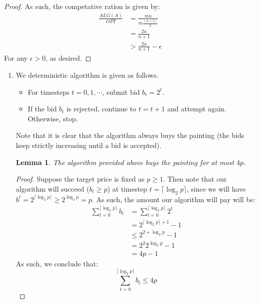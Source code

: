 \documentclass[12pt]{exam}
\newtheorem{lemma}[theorem]{Lemma}
\newcommand{\Q}[1]{\question{\large{\textbf{#1}}}}
\begin{document}
\begin{questions}
\begin{solution}
\begin{enumerate}[label=(\alph*)]
\begin{proof}
        As such, the competative ration is given by:
        \begin{align*}
          \frac{ALG(A)}{OPT} &= \frac{mn}{m\frac{(n+1)}{2}} \\
          &= \frac{2n}{n+1} \\
          &> \frac{2n}{n+1} - \epsilon
        \end{align*}
        For any $\epsilon > 0$, as desired.
      \end{proof}
    \end{enumerate}
\end{solution}


\newpage
\Q{Problem 18}
\begin{solution}
  \begin{enumerate}[label=(\alph*)]
    \item We deterministic algorithm is given as follows.
      \begin{itemize}
        \item For timesteps $t=0,1,\cdots$, submit bid $b_t = 2^t$.
        \item If the bid $b_t$ is rejected, continue to $t = t+1$ and attempt again. Otherwise, stop.
      \end{itemize}
    Note that it is clear that the algorithm always buys the painting (the bids keep strictly increasing until a bid is accepted).

    \begin{lemma}
      The algorithm provided above buys the painting for at most $4p$.
    \end{lemma}
    \begin{proof}
      Suppose the target price is fixed as $p \geq 1$. Then note that our algorithm will succeed ($b_t \geq p$) at timestep $t = \lceil \log_2 p \rceil$, since we will have $b^t = 2^{\lceil \log_2 p \rceil} \geq 2^{\log_2 p} = p$. As such, the amount our algorithm will pay will be:
      \begin{align*}
        \sum_{t=0}^{\lceil \log_2 p \rceil } b_t &= \sum_{t=0}^{\lceil \log_2 p \rceil } 2^t \\
        &= 2^{\lceil \log_2 p \rceil + 1} - 1 \tag{Summation of geometric series} \\
        &\leq 2^{2 + \log_2 p} - 1 \tag{$\lceil \log_2 p \rceil \leq \log_2 p + 1$} \\
        &= 2^2 2^{\log_2 p} - 1 \\
        &= 4p - 1
      \end{align*}
      As such, we conclude that:
      \[
        \sum_{t=0}^{\lceil \log_2 p \rceil} b_t \leq 4p
      \]
    \end{proof}


\end{enumerate}
\end{solution}
\end{questions}
\end{document}
